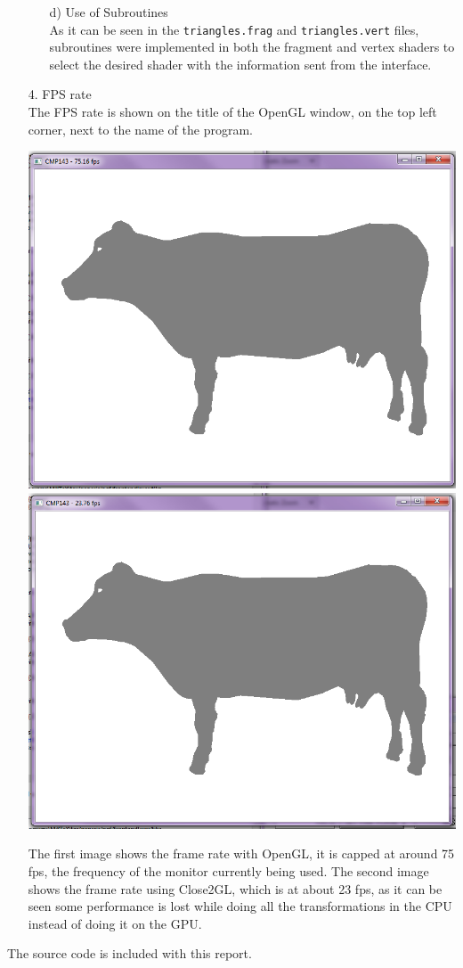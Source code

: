 \documentclass[12pt]{article}
\begin{document}
\begin{itemize}
\begin{itemize}
\begin{center}
\end{center}
\item[d)] Use of Subroutines\\
As it can be seen in the \texttt{triangles.frag} and \texttt{triangles.vert} files, subroutines were implemented in both the fragment and vertex shaders to select the desired shader with the information sent from the interface.
\end{itemize}
\item[4.] FPS rate\\
The FPS rate is shown on the title of the OpenGL window, on the top left corner, next to the name of the program.
\begin{center}
\includegraphics[scale=0.4]{18.png}
\includegraphics[scale=0.4]{19.png}
\end{center}
The first image shows the frame rate with OpenGL, it is capped at around 75 fps, the frequency of the monitor currently being used. The second image shows the frame rate using Close2GL, which is at about 23 fps, as it can be seen some performance is lost while doing all the transformations in the CPU instead of doing it on the GPU.
\end{itemize}

The source code is included with this report.
\end{document}
